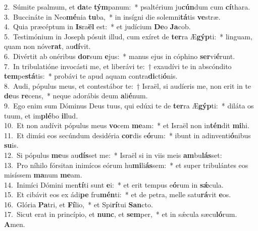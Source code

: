 {2.~}Súmite psalmum, et \textbf{da}te \textbf{tým}panum:~* psaltérium ju\textbf{cún}dum cum \textbf{cí}thara.\\
{3.~}Buccináte in Neo\textbf{mé}nia \textbf{tu}ba,~* in insígni die solemni\textbf{tá}tis \textbf{ve}stræ.\\
{4.~}Quia præcéptum in \textbf{Is}ra\textbf{ël} est:~* et judícium \textbf{De}o \textbf{Ja}cob.\\
{5.~}Testimónium in Joseph pósuit illud, cum exíret de \textbf{ter}ra Æ\textbf{gýp}ti:~* linguam, quam non nóve\textbf{rat}, au\textbf{dí}vit.\\
{6.~}Divértit ab onéribus \textbf{dor}sum \textbf{e}jus:~* manus ejus in cóphino \textbf{ser}vi\textbf{é}runt.\\
{7.~}In tribulatióne invocásti me, et liberávi te:~† exaudívi te in abscóndito \textbf{tem}pe\textbf{stá}tis:~* probávi te apud aquam contra\textbf{di}cti\textbf{ó}nis.\\
{8.~}Audi, pópulus meus, et contestábor te:~† Israël, si audíeris me, non erit in te \textbf{de}us \textbf{re}cens,~* neque adorábis deum \textbf{a}li\textbf{é}num.\\
{9.~}Ego enim sum Dóminus Deus tuus, qui edúxi te de \textbf{ter}ra Æ\textbf{gýp}ti:~* diláta os tuum, et im\textbf{plé}bo \textbf{il}lud.\\
{10.~}Et non audívit pópulus meus \textbf{vo}cem \textbf{me}am:~* et Israël non in\textbf{tén}dit \textbf{mi}hi.\\
{11.~}Et dimísi eos secúndum desidéria \textbf{cor}dis e\textbf{ó}rum:~* ibunt in adinventi\textbf{ó}nibus \textbf{su}is.\\
{12.~}Si pópulus \textbf{me}us au\textbf{dís}set me:~* Israël si in viis meis \textbf{am}bu\textbf{lás}set:\\
{13.~}Pro níhilo fórsitan inimícos eórum hu\textbf{mi}li\textbf{ás}sem:~* et super tribulántes eos misíssem \textbf{ma}num \textbf{me}am.\\
{14.~}Inimíci Dómini men\textbf{tí}ti sunt \textbf{e}i:~* et erit tempus e\textbf{ó}rum in \textbf{sǽ}cula.\\
{15.~}Et cibávit eos ex ádi\textbf{pe} fru\textbf{mén}ti:~* et de petra, melle satu\textbf{rá}vit \textbf{e}os.\\
{16.~}Glória \textbf{Pa}tri, et \textbf{Fí}lio,~* et Spi\textbf{rí}tui \textbf{San}cto.\\
{17.~}Sicut erat in princípio, et \textbf{nunc}, et \textbf{sem}per,~* et in sǽcula sæcu\textbf{ló}rum. \textbf{A}men.\\
